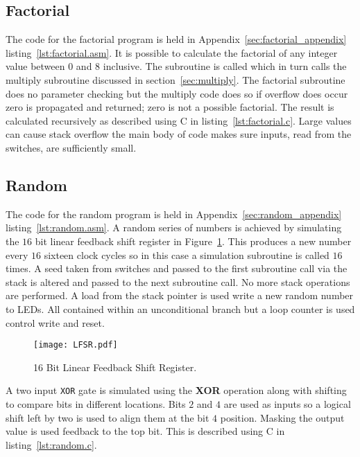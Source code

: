 \subsection{Factorial}
\label{sec:factorial}
The code for the factorial program is held in Appendix~\ref{sec:factorial_appendix} listing~\ref{lst:factorial.asm}.
It is possible to calculate the factorial of any integer value between $0$ and $8$ inclusive.
The subroutine is called which in turn calls the multiply subroutine discussed in section~\ref{sec:multiply}. 
The factorial subroutine does no parameter checking but the multiply code does so if overflow does occur zero is propagated and returned; zero is not a possible factorial.
The result is calculated recursively as described using C in listing~\ref{lst:factorial.c}.
Large values can cause stack overflow the main body of code makes sure inputs, read from the switches, are sufficiently small.








\subsection{Random}
The code for the random program is held in Appendix~\ref{sec:random_appendix} listing~\ref{lst:random.asm}.
A random series of numbers is achieved by simulating the $16$ bit linear feedback shift register in Figure~\ref{fig:lfsr}. 
This produces a new number every $16$ sixteen clock cycles so in this case a simulation subroutine is called $16$ times.
A seed taken from switches and passed to the first subroutine call via the stack is altered and passed to the next subroutine call.
No more stack operations are performed.
A load from the stack pointer is used write a new random number to LEDs.
All contained within an unconditional branch but a loop counter is used control write and reset.

\begin{figure}[ht]
   \centering
    \texttt{[image: LFSR.pdf]}
		\caption{16 Bit Linear Feedback Shift Register.}%
   \label{fig:lfsr}
\end{figure}

A two input \texttt{XOR} gate is simulated using the \textbf{XOR} operation along with shifting to compare bits in different locations.
Bits $2$ and $4$ are used as inputs so a logical shift left by two is used to align them at the bit $4$ position. 
Masking the output value is used feedback to the top bit.
This is described using C in listing~\ref{lst:random.c}. 

